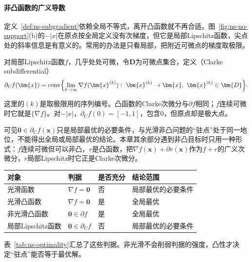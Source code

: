 \paragraph{非凸函数的广义导数}
定义~\ref{def:ns-subgradient}依赖全局不等式，离开凸函数就不再合适。图~\ref{fig:ns-no-support}(b)的$-\lvert x\rvert$在原点按全局定义没有次梯度，但它是局部Lipschitz函数，尖点处的斜率信息是有意义的。常用的办法是只看局部，把附近可微点的梯度取极限。

对局部Lipschitz函数$f$，几乎处处可微，令$\bm{D}$为可微点集合，定义（Clarke subdifferential）
\begin{equation}
 \partial_{\mathrm{C}}f(\bm{x})=\operatorname{conv}\Bigl\{\lim_{k\to\infty}\nabla f(\bm{x}^{(k)}):\ \bm{x}^{(k)}\to\bm{x},\ \bm{x}^{(k)}\in\bm{D}\Bigr\}.
 \label{eq:ns-clarke}
\end{equation}

这里的$(k)$是取极限用的序列编号。凸函数的Clarke次微分与$\partial f$相同；$f$连续可微时它就是$\{\nabla f\}$。对$-\lvert x\rvert$，$\partial_{\mathrm{C}}f(0)=[-1,1]$，包含$0$，但原点却是极大点。

可见$\bm{0}\in\partial_{\mathrm{C}}f(\bm{x})$只是局部最优的必要条件，与光滑非凸问题的“驻点”处于同一地位，不能得出全局或局部最优的结论。本章其余部分遇到非凸目标时只用一种形式：$f$连续可微但可以非凸，$r$是凸函数，把$\nabla f(\bm{x})+\partial r(\bm{x})$作为$f+r$的广义次微分，$r$局部Lipschitz时它正是Clarke次微分。

\begin{BookInlineTable}
  \centering
  \small
  \begin{tabular}{@{}llll@{}}
    \toprule
    对象 & 判据 & 是否充分 & 结论范围\\
    \midrule
    光滑函数 & $\nabla f=\bm{0}$ & 否 & 局部最优的必要条件\\
    光滑凸函数 & $\nabla f=\bm{0}$ & 是 & 全局最优\\
    非光滑凸函数 & $\bm{0}\in\partial f$ & 是 & 全局最优\\
    局部Lipschitz函数 & $\bm{0}\in\partial_{\mathrm{C}}f$ & 否 & 局部最优的必要条件\\
    \bottomrule
  \end{tabular}
  \caption{不同函数类上的一阶判据。是否充分取决于凸性，与是否光滑无关。}
  \label{tab:ns-optimality}
\end{BookInlineTable}

表~\ref{tab:ns-optimality}汇总了这些判据。非光滑不会削弱判据的强度，凸性才决定“驻点”能否等于最优解。
